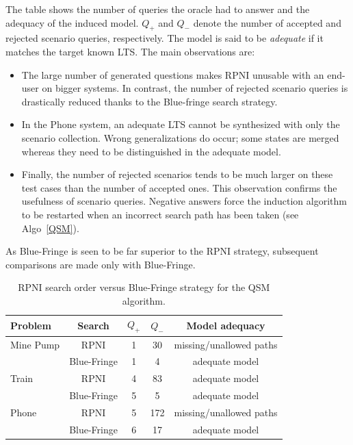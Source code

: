 The table shows the number of queries the oracle had to answer and the adequacy of the induced model. $Q_+$ and $Q_-$ denote the number of accepted and rejected scenario queries, respectively. The model is said to be \emph{adequate} if it matches the target known LTS. The main observations are:
\begin{itemize}
\item The large number of generated questions makes RPNI unusable with an end-user on bigger systems. In contrast, the number of rejected scenario queries is drastically reduced thanks to the Blue-fringe search strategy. 
\item In the Phone system, an adequate LTS cannot be synthesized with only the scenario collection. Wrong generalizations do occur; some states are merged whereas they need to be distinguished in the adequate model.
\item Finally, the number of rejected scenarios tends to be much larger on these test cases than the number of accepted ones. This observation confirms the usefulness of scenario queries. Negative answers force the induction algorithm to be restarted when an incorrect search path has been taken (see Algo~\ref{QSM}).
\end{itemize}


As Blue-Fringe is seen to be far superior to the RPNI strategy, subsequent comparisons are made only with Blue-Fringe.

\begin{table}[H]
\centering
\begin{tabular}{|l||c||c|c|c|}\hline
Problem   & Search      &$Q_+$&$Q_-$& Model adequacy\\\hline\hline
Mine Pump & RPNI        & 1   & 30  & missing/unallowed paths\\\cline{2-5}
          & Blue-Fringe & 1   & 4   & adequate model\\\hline
Train     & RPNI        & 4   & 83  & adequate model\\\cline{2-5}
          & Blue-Fringe & 5   & 5   & adequate model\\\hline
Phone     & RPNI        & 5   & 172 & missing/unallowed paths\\\cline{2-5}
          & Blue-Fringe & 6   & 17  & adequate model\\\hline
\end{tabular}
\caption{RPNI search order versus Blue-Fringe strategy for the QSM algorithm.\label{RPNI:Blue-fringe}}
\end{table}

